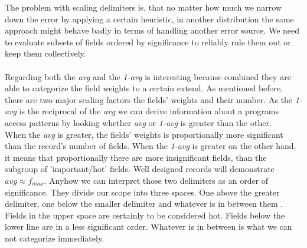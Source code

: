 The problem with scaling delimiters is, that no matter how much we narrow down the error by applying a certain heuristic, in another distribution the same approach might behave badly in terms of handling another error source. We need to evaluate subsets of fields ordered by significance to reliably rule them out or keep them collectively.\\\\
Regarding both the \textit{avg} and the \textit{1-avg} is interesting because combined they are able to categorize the field weights to a certain extend. As mentioned before, there are two major scaling factors the fields' weights and their number. As the \textit{1-avg} is the reciprocal of the \textit{avg} we can derive information about a programs access patterns by looking whether \textit{avg} or \textit{1-avg} is greater than the other.\\
When the \textit{avg} is greater, the fields' weights is proportionally more significant than the record's number of fields. When the \textit{1-avg} is greater on the other hand, it means that proportionally there are more insignificant fields, than the subgroup of 'important/hot' fields. Well designed records will demonstrate $avg\approx f_{max}$. Anyhow we can interpret those two delimiters as an order of significance. They divide our scope into three spaces. One above the greater delimiter, one below the smaller delimiter and whatever is in between them . Fields in the upper space are certainly to be considered hot. Fields below the lower line are in a less significant order. Whatever is in between is what we can not categorize immediately. 
